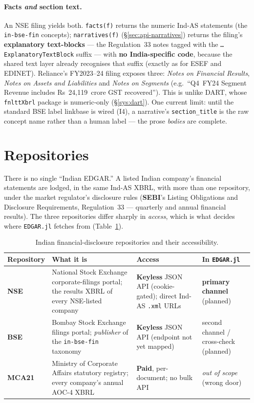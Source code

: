 \documentclass[11pt,a4paper]{report}
\begin{document}
\paragraph{Facts \emph{and} section text.} An NSE filing yields both. \texttt{facts(f)} returns the numeric
Ind-AS statements (the \texttt{in-bse-fin} concepts); \texttt{narratives(f)} (\S\ref{sec:api-narratives})
returns the filing's \textbf{explanatory text-blocks} --- the Regulation~33 notes tagged with the
\texttt{\ldots{}ExplanatoryTextBlock} suffix --- with \textbf{no India-specific code}, because the shared
text layer already recognises that suffix (exactly as for ESEF and EDINET). Reliance's FY2023--24 filing
exposes three: \emph{Notes on Financial Results}, \emph{Notes on Assets and Liabilities} and \emph{Notes on
Segments} (e.g.\ ``Q4~FY24 Segment Revenue includes Rs~24{,}119~crore GST recovered''). This is unlike DART,
whose \texttt{fnlttXbrl} package is numeric-only (\S\ref{sys:dart}). One current limit: until the standard
BSE label linkbase is wired (I4), a narrative's \texttt{section\_title} is the raw concept name rather than a
human label --- the prose \emph{bodies} are complete.

\section{Repositories}\label{sec:india-repos}

There is no single ``Indian EDGAR.'' A listed Indian company's financial statements are lodged, in the same
Ind-AS XBRL, with more than one repository, under the market regulator's disclosure rules (\textbf{SEBI}'s
Listing Obligations and Disclosure Requirements, Regulation~33 --- quarterly and annual financial results).
The three repositories differ sharply in \emph{access}, which is what decides where \texttt{EDGAR.jl}
fetches from (Table~\ref{tab:india-repos}).

\begin{table}[h]
\centering
\small
\caption{Indian financial-disclosure repositories and their accessibility.}
\label{tab:india-repos}
\begin{tabular}{@{}p{}p{}p{}p{}@{}}
\toprule
\textbf{Repository} & \textbf{What it is} & \textbf{Access} & \textbf{In \texttt{EDGAR.jl}} \\
\midrule
\textbf{NSE} & National Stock Exchange corporate-filings portal; the results XBRL of every NSE-listed company & \textbf{Keyless} JSON API (cookie-gated); direct Ind-AS \texttt{.xml} URLs & \textbf{primary channel} (planned) \\
\textbf{BSE} & Bombay Stock Exchange filings portal; \emph{publisher} of the \texttt{in-bse-fin} taxonomy & \textbf{Keyless} JSON API (endpoint not yet mapped) & second channel / cross-check (planned) \\
\textbf{MCA21} & Ministry of Corporate Affairs statutory registry; every company's annual AOC-4 XBRL & \textbf{Paid}, per-document; no bulk API & \emph{out of scope} (wrong door) \\
\bottomrule
\end{tabular}
\end{table}
\end{document}
